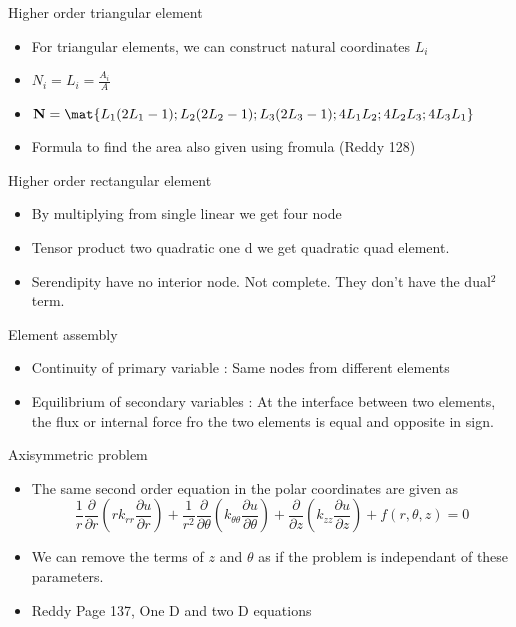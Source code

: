 	\begin{frame}{Higher order triangular element}
		\begin{itemize}
			\item For triangular elements, we can construct natural coordinates $L_i$
			\item $N_i = L_i = \frac{A_i}{A}$
			\item $\ve{N} = \mat{L_1(2L_1-1);L_2(2L_2-1);L_3(2L_3-1);4L_1L_2;4L_2L_3;4L_3L_1}$
			\item Formula to find the area also given using fromula (Reddy 128)
		\end{itemize}
	\end{frame}


	\begin{frame}{Higher order rectangular element}
		\begin{itemize}
			\item By multiplying from single linear we get four node
			\item Tensor product two quadratic one d we get quadratic quad element. 
			\item Serendipity have no interior node. Not complete. They don't have the dual$^2$ term. 
		\end{itemize}
	\end{frame}



	\begin{frame}{Element assembly}
		\begin{itemize}
			\item Continuity of primary variable : Same nodes from different elements
			\item Equilibrium of secondary variables : At the interface between two elements, the flux or internal force fro the two elements is equal and opposite in sign. 
			
		\end{itemize}
	\end{frame}



	\begin{frame}{Axisymmetric problem}
		\begin{itemize}
			\item   The same second order equation in the polar coordinates are given as 
			\begin{equation}
				\frac{1}{r}\frac{\partial }{\partial r}\left(r k_{rr} \frac{\partial u}{\partial r} \right)
				+ \frac{1}{r^2}\frac{\partial }{\partial \theta}\left( k_{\theta\theta} \frac{\partial u}{\partial \theta} \right)
				+ \frac{\partial }{\partial z}\left(k_{zz} \frac{\partial u}{\partial z} \right) + f(r,\theta,z)=0
			\end{equation}
			\item We can remove the terms of $z$ and $\theta$ as if the problem is independant of these parameters. 
			\item Reddy Page 137, One D and two D equations
		\end{itemize}
	\end{frame}



